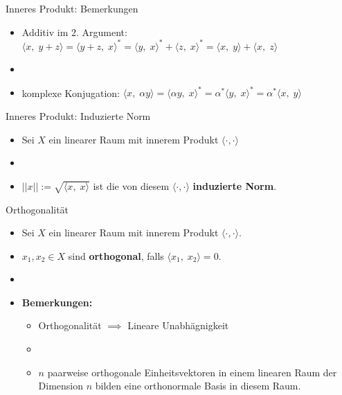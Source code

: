 \documentclass[14pt, aspectratio=169, handout]{beamer}
\begin{document}
\begin{frame}{Inneres Produkt: Bemerkungen}
    \begin{itemize}
        \item Additiv im 2. Argument: $\langle x, \; y+z \rangle = \langle y + z, \; x \rangle^* = \langle y, \; x \rangle^* + \langle z, \; x \rangle^* = \langle x, \; y \rangle + \langle x, \; z \rangle$
        \item[] 
        \item komplexe Konjugation: $\langle x, \; \alpha y\rangle = \langle \alpha y, \; x \rangle^* = \alpha^* \langle y, \; x \rangle^* = \alpha^* \langle x, \; y \rangle$
    \end{itemize}
\end{frame}

\begin{frame}{Inneres Produkt: Induzierte Norm}
    \begin{itemize}
        \item Sei $X$ ein linearer Raum mit innerem Produkt $\langle \cdot, \cdot\rangle$
        \item[] 
        \item $||x|| := \sqrt{\langle x, \; x\rangle}$ ist die von diesem $\langle \cdot, \cdot\rangle$ \textbf{induzierte Norm}.
    \end{itemize}
\end{frame}

\begin{frame}{Orthogonalität}
    \begin{itemize}
        \item Sei $X$ ein linearer Raum mit innerem Produkt $\langle \cdot, \cdot \rangle$.
        \item[] $x_1, x_2 \in X$ sind \textbf{orthogonal}, falls $\langle x_1, \; x_2\rangle = 0$.
        \item[] 
        \item \textbf{Bemerkungen:}\begin{itemize}
            \item[(i)] Orthogonalität $\implies$ Lineare Unabhägnigkeit
            \item[] 
            \item[(ii)] $n$ paarweise orthogonale Einheitsvektoren in einem linearen Raum der Dimension $n$ bilden eine orthonormale Basis in diesem Raum.
        \end{itemize}
    \end{itemize}
\end{frame}
\end{document}
